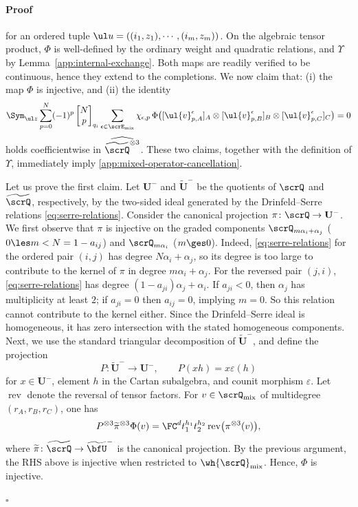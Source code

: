 \documentclass[reqno]{amsart}
\numberwithin{equation}{section}
\newenvironment{pf}{\medskip\paragraph{{\sc Proof}}}{\hfill$\square$\par\medskip}
\begin{document}
\begin{pf}
for an ordered tuple ${\ul u} = ((i_1, z_1), \cdots, (i_m, z_m))$.
On the algebraic tensor product, $\Phi$ is well-defined by the ordinary
weight and quadratic relations, and $\Upsilon$ by
Lemma~\ref{app:internal-exchange}. Both maps are readily verified to be continuous, hence they extend to the completions.
We now claim that: (i) the map $\Phi$ is injective, and (ii) the identity 
\begin{equation} \label{eqapp: Sym 2 id}
\Sym_{\ul z}\sum_{p=0}^{N}(-1)^p
\begin{bmatrix}N\\p\end{bmatrix}_{q_i}
\sum_{\epsilon\in\scrE_{\rm mix}}\chi_{\epsilon,p}\,
\Phi \big( [\ul{v}_{p,A}^\epsilon]_A \otimes 
[\ul{v}_{p,B}^\epsilon]_B \otimes 
[\ul{v}_{p,C}^\epsilon]_C \big) = 0
\end{equation} 
holds coefficientwise in $\widehat{\widetilde{\scrQ}^{\otimes3}}$.
These two claims, together with the definition of $\Upsilon$, immediately
imply \eqref{app:mixed-operator-cancellation}.

Let us prove the first claim. Let $\mathbf{U}^-$ and $\widetilde{\mathbf{U}}^-$ be the quotients of $\scrQ$ and $\widetilde{\scrQ}$, respectively, by the two-sided ideal generated by the Drinfeld--Serre relations \eqref{eq:serre-relations}. Consider the canonical projection $\pi \colon \scrQ \to \mathbf{U}^-$. We first observe that $\pi$ is injective on the graded components $\scrQ_{m\alpha_i + \alpha_j}$ ($0 \les m < N=1-a_{ij}$) and $\scrQ_{m\alpha_i}$ ($m \ges 0$). Indeed, \eqref{eq:serre-relations} for the ordered pair $(i,j)$ has degree $N\alpha_i + \alpha_j$, so its degree is too large to contribute to the kernel of $\pi$ in degree $m \alpha_i + \alpha_j$. For the reversed pair $(j,i)$, \eqref{eq:serre-relations} has degree $(1-a_{ji})\alpha_j + \alpha_i$. If $a_{ji} < 0$, then $\alpha_j$ has multiplicity at least $2$; if $a_{ji} = 0$ then $a_{ij} = 0$, implying $m = 0$. So this relation cannot contribute to the kernel either. Since the Drinfeld--Serre ideal is homogeneous, it has zero intersection with the stated homogeneous components. Next, we use the standard triangular decomposition of $\widetilde{\mathbf{U}}^-$, and define the projection 
\[
P \colon \widetilde{\mathbf{U}}^- \to \mathbf{U}^-, \qquad P(xh) = x \varepsilon(h)
\]   
for $x \in \mathbf{U}^-$, element $h$ in the Cartan subalgebra, and counit morphism 
$\varepsilon$. Let $\operatorname{rev}$ denote the reversal of tensor factors. 
For $v\in\scrQ_{\operatorname{mix}}$ of multidegree $(r_A,r_B,r_C)$,
one has
\[
P^{\otimes3}\widetilde\pi^{\otimes3}\Phi(v)
=\FC^d t_1^{h_1}t_2^{h_2}
\operatorname{rev}\bigl(\pi^{\otimes3}(v)\bigr),
\]
where $\widetilde\pi\colon\widetilde{\scrQ}\to\widetilde{\bfU}^-$
is the canonical projection.
By the previous argument, the RHS above is injective when restricted to 
$\wh{\scrQ}_{\operatorname{mix}}$. Hence, $\Phi$ is injective.


\end{pf}
\end{document}
